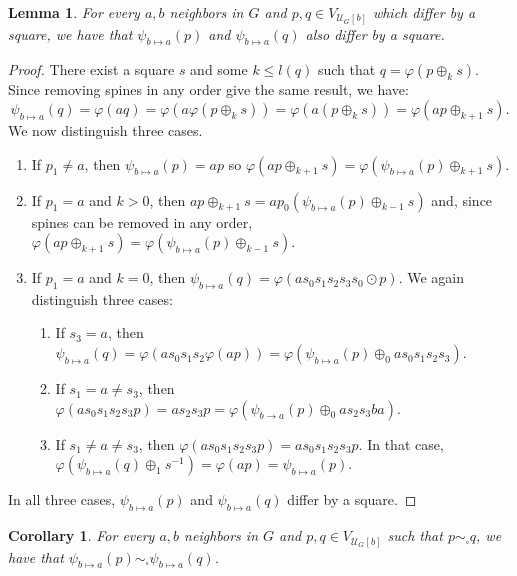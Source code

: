 \documentclass{article}
\newtheorem{lemma}[theorem]{Lemma}
\newtheorem{corollary}[theorem]{Corollary}
\begin{document}
\begin{lemma}
For every $a, b$ neighbors in $G$ and $p,q \in V_{\mathcal{U}_G[b]}$ which differ by a square, we have that $\psi_{b \mapsto a}(p)$ and $\psi_{b \mapsto a}(q)$ also differ by a square.
\end{lemma}

\begin{proof}
There exist a square $s$ and some $k \le l(q)$ such that $q = \varphi(p \oplus_k s)$. Since removing spines in any order give the same result, we have:
\[\psi_{b \mapsto a}(q) = \varphi(aq) = \varphi(a\varphi(p \oplus_k s)) = \varphi(a (p\oplus_k s)) = \varphi (ap \oplus_{k+1} s).\]
We now distinguish three cases.
\begin{enumerate}
\item If $p_1 \neq a$, then $\psi_{b \mapsto a}(p) = ap$ so $\varphi (ap \oplus_{k+1} s) = \varphi(\psi_{b \mapsto a}(p) \oplus_{k+1} s)$.

\item If $p_1 = a$ and $k>0$, then $ap \oplus_{k+1} s = ap_0 (\psi_{b \mapsto a}(p) \oplus_{k-1} s)$ and, since spines can be removed in any order, 
$\varphi (ap \oplus_{k+1} s) = \varphi(\psi_{b \mapsto a}(p) \oplus_{k-1} s)$.

\item If $p_1 = a$ and $k=0$, then $\psi_{b \mapsto a}(q) = \varphi(a s_0 s_1 s_2 s_3 s_0\odot p)$. We again distinguish three cases:
\begin{enumerate}
\item If $s_3 = a$, then $\psi_{b \mapsto a}(q) = \varphi(a s_0 s_1 s_2 \varphi(ap)) = \varphi(\psi_{b \mapsto a}(p) \oplus_0 a s_0 s_1 s_2 s_3)$.
\item If $s_1 = a \neq s_3$, then $\varphi(a s_0 s_1 s_2 s_3 p) = a s_2 s_3 p = \varphi(\psi_{b\to a}(p) \oplus_0 a s_2 s_3 b a)$.
\item If $s_1 \neq a \neq s_3$, then $\varphi(a s_0 s_1 s_2 s_3 p) = a s_0 s_1 s_2 s_3 p$. In that case, $\varphi(\psi_{b \mapsto a}(q) \oplus_1 s^{-1}) = \varphi(ap) = \psi_{b \mapsto a}(p)$.

\end{enumerate}
\end{enumerate}
In all three cases, $\psi_{b \mapsto a}(p)$ and $\psi_{b \mapsto a}(q)$ differ by a square.
\end{proof}

\begin{corollary}\label{cor.morphism.quotient}
For every $a, b$ neighbors in $G$ and $p,q \in V_{\mathcal{U}_G[b]}$ such that $p \sim_{\square} q$, we have that $\psi_{b \mapsto a}(p) \sim_{\square} \psi_{b \mapsto a}(q)$.
\end{corollary}
\end{document}
